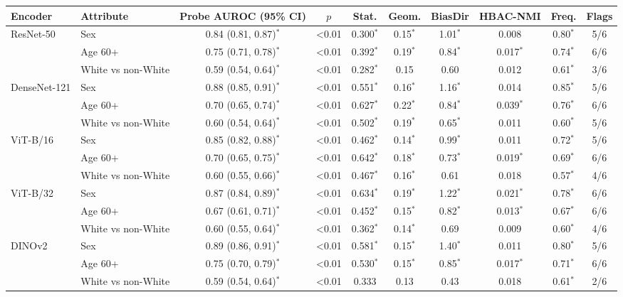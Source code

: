 \begin{tabular}{llcccccccc}
\toprule
Encoder & Attribute & Probe AUROC (95\% CI) & $p$ & Stat. & Geom. & BiasDir & HBAC-NMI & Freq. & Flags \\
\midrule
ResNet-50 & Sex & 0.84 (0.81, 0.87)$^{*}$ & <0.01 & 0.300$^{*}$ & 0.15$^{*}$ & 1.01$^{*}$ & 0.008 & 0.80$^{*}$ & 5/6 \\
 & Age 60+ & 0.75 (0.71, 0.78)$^{*}$ & <0.01 & 0.392$^{*}$ & 0.19$^{*}$ & 0.84$^{*}$ & 0.017$^{*}$ & 0.74$^{*}$ & 6/6 \\
 & White vs non-White & 0.59 (0.54, 0.64)$^{*}$ & <0.01 & 0.282$^{*}$ & 0.15 & 0.60 & 0.012 & 0.61$^{*}$ & 3/6 \\
\midrule
DenseNet-121 & Sex & 0.88 (0.85, 0.91)$^{*}$ & <0.01 & 0.551$^{*}$ & 0.16$^{*}$ & 1.16$^{*}$ & 0.014 & 0.85$^{*}$ & 5/6 \\
 & Age 60+ & 0.70 (0.65, 0.74)$^{*}$ & <0.01 & 0.627$^{*}$ & 0.22$^{*}$ & 0.84$^{*}$ & 0.039$^{*}$ & 0.76$^{*}$ & 6/6 \\
 & White vs non-White & 0.60 (0.54, 0.64)$^{*}$ & <0.01 & 0.502$^{*}$ & 0.19$^{*}$ & 0.65$^{*}$ & 0.011 & 0.60$^{*}$ & 5/6 \\
\midrule
ViT-B/16 & Sex & 0.85 (0.82, 0.88)$^{*}$ & <0.01 & 0.462$^{*}$ & 0.14$^{*}$ & 0.99$^{*}$ & 0.011 & 0.72$^{*}$ & 5/6 \\
 & Age 60+ & 0.70 (0.65, 0.75)$^{*}$ & <0.01 & 0.642$^{*}$ & 0.18$^{*}$ & 0.73$^{*}$ & 0.019$^{*}$ & 0.69$^{*}$ & 6/6 \\
 & White vs non-White & 0.60 (0.55, 0.66)$^{*}$ & <0.01 & 0.467$^{*}$ & 0.16$^{*}$ & 0.61 & 0.018 & 0.57$^{*}$ & 4/6 \\
\midrule
ViT-B/32 & Sex & 0.87 (0.84, 0.89)$^{*}$ & <0.01 & 0.634$^{*}$ & 0.19$^{*}$ & 1.22$^{*}$ & 0.021$^{*}$ & 0.78$^{*}$ & 6/6 \\
 & Age 60+ & 0.67 (0.61, 0.71)$^{*}$ & <0.01 & 0.452$^{*}$ & 0.15$^{*}$ & 0.82$^{*}$ & 0.013$^{*}$ & 0.67$^{*}$ & 6/6 \\
 & White vs non-White & 0.60 (0.55, 0.64)$^{*}$ & <0.01 & 0.362$^{*}$ & 0.14$^{*}$ & 0.69 & 0.009 & 0.60$^{*}$ & 4/6 \\
\midrule
DINOv2 & Sex & 0.89 (0.86, 0.91)$^{*}$ & <0.01 & 0.581$^{*}$ & 0.15$^{*}$ & 1.40$^{*}$ & 0.011 & 0.80$^{*}$ & 5/6 \\
 & Age 60+ & 0.75 (0.70, 0.79)$^{*}$ & <0.01 & 0.530$^{*}$ & 0.15$^{*}$ & 0.85$^{*}$ & 0.017$^{*}$ & 0.71$^{*}$ & 6/6 \\
 & White vs non-White & 0.59 (0.54, 0.64)$^{*}$ & <0.01 & 0.333 & 0.13 & 0.43 & 0.018 & 0.61$^{*}$ & 2/6 \\

\end{tabular}
